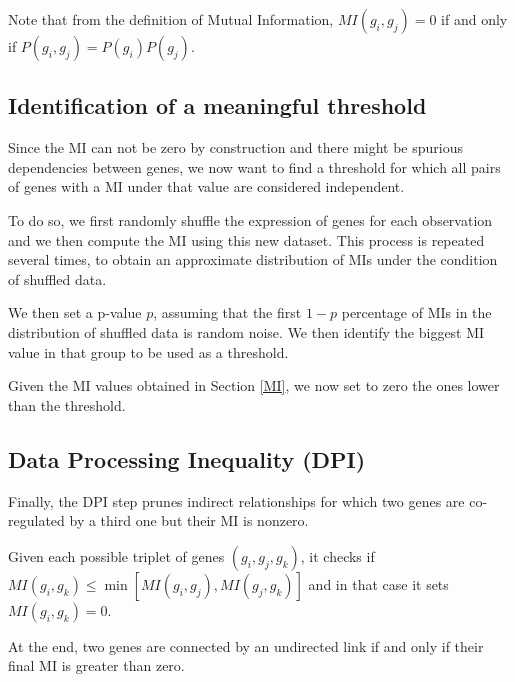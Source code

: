 Note that from the definition of Mutual Information,
$\mathit{MI}(g_i, g_j) = 0$
if and only if $P(g_i, g_j) = P(g_i) P(g_j)$.

\subsection{Identification of a meaningful threshold}
Since the MI can not be zero by construction
and there might be spurious dependencies between genes,
we now want to find a threshold for which
all pairs of genes with a MI under that value are considered independent.

To do so, we first randomly shuffle the expression of genes for each observation
and we then compute the MI using this new dataset.
This process is repeated several times,
to obtain an approximate distribution of MIs under the condition of shuffled data.

We then set a p-value $p$, assuming that the first $1-p$ percentage of
MIs in the distribution of shuffled data is random noise.
We then identify the biggest MI value in that group to be used as a threshold.

Given the MI values obtained in Section \ref{MI},
we now set to zero the ones lower than the threshold.

\subsection{Data Processing Inequality (DPI)}
Finally, the DPI step prunes indirect relationships for which two
genes are co-regulated by a third one but their MI is nonzero.

Given each possible triplet of genes $(g_i, g_j, g_k)$,
it checks if $\mathit{MI}(g_i, g_k) \leq \min[\mathit{MI}(g_i, g_j), \mathit{MI}(g_j, g_k)]$
and in that case it sets $\mathit{MI}(g_i, g_k) = 0$.

At the end, two genes are connected by an undirected link if and only if
their final MI is greater than zero.